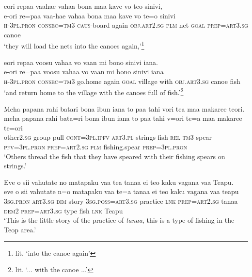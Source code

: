 \ea\label{ex:text25-17}
eori repaa vaahae vahaa bona maa kave vo teo sinivi,\\
\gll e-ori	re=paa	vaa-hae	vahaa	bona	maa	kave	vo	te=o	sinivi\\
     \textsc{h}-3\textsc{pl}.\textsc{pron}	\textsc{consec}=\textsc{tm}3	\textsc{caus}-board	again	\textsc{obj}.\textsc{art}2.\textsc{sg}	\textsc{plm}	net	\textsc{goal}	\textsc{prep}=\textsc{art}3.\textsc{sg}	canoe\\
\glt `they will load the nets into the canoes again,'\footnote{lit. `into the canoe again'}
\z

\newpage
\ea\label{ex:text25-18}
eori repaa voosu vahaa vo vaan mi bono sinivi iana.\\
\gll e-ori	re=paa	voosu	vahaa	vo	vaan	mi	bono	sinivi	iana\\
     \textsc{h}-3\textsc{pl}.\textsc{pron}	\textsc{consec}=\textsc{tm}3	go.home	again	\textsc{goal}	village	with	\textsc{obj}.\textsc{art}3.\textsc{sg}	canoe	fish\\
\glt `and return home to the village with the canoes full of fish.'\footnote{lit. `... with the canoe ...'}
\z

\ea\label{ex:text25-19}
Meha papana rahi batari bona ibun iana to paa tahi vori tea maa makaree teori.\\
\gll meha	papana	rahi	bata=ri	bona	ibun	iana	to	paa	tahi	v=ori	te=a	maa	makaree	te=ori\\
     other2.\textsc{sg}	group	pull	\textsc{cont}=3\textsc{pl}.\textsc{ipfv}	\textsc{art}3.\textsc{pl}	strings	fish	\textsc{rel}	\textsc{tm}3	spear	\textsc{pfv}=3\textsc{pl}.\textsc{pron}	\textsc{prep}=\textsc{art}2.\textsc{sg}	\textsc{plm}	fishing.spear	\textsc{prep}=3\textsc{pl}.\textsc{pron}\\
\glt `Others thread the fish that they have speared with their fishing spears on strings.'
\z

\ea\label{ex:text25-20}
Eve o sii vahutate no matapaku vaa tea tanaa ei teo kaku vagana vaa Teapu.\\
\gll eve	o	sii	vahutate	n=o	matapaku	vaa	te=a	tanaa	ei	teo	kaku	vagana	vaa	teapu\\
     3\textsc{sg}.\textsc{pron}	\textsc{art}3.\textsc{sg}	\textsc{dim}	story	3\textsc{sg}.\textsc{poss}=\textsc{art}3.\textsc{sg}	practice	\textsc{lnk}	\textsc{prep}=\textsc{art}2.\textsc{sg}	tanaa	\textsc{dem}2	\textsc{prep}=\textsc{art}3.\textsc{sg}	type	fish	\textsc{lnk}	Teapu\\
\glt `This is the little story of the practice of \textit{tanaa}, this is a type of fishing in the Teop area.'
\z
